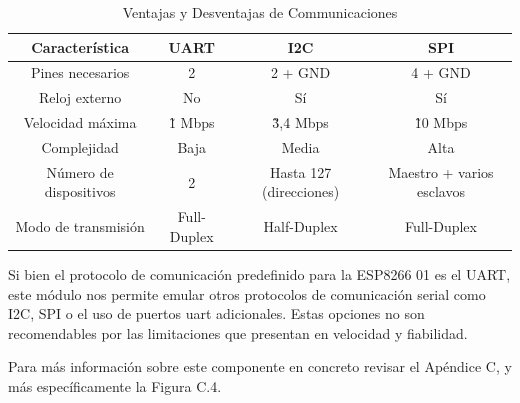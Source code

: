                 \begin{table}[H]
                    \centering
                    \begin{tabular}{|c|c|c|c|}
                        \hline
                         Característica & UART & I2C & SPI\\
                        \hline
                         Pines necesarios & 2 & 2 + GND & 4 + GND\\
                        \hline
                        Reloj externo & No & Sí & Sí\\
                        \hline
                        Velocidad máxima & \~1 Mbps & \~3,4 Mbps & \~10 Mbps\\
                        \hline
                        Complejidad & Baja & Media & Alta\\
                        \hline
                        Número de dispositivos & 2 & Hasta 127 (direcciones) & Maestro + varios esclavos\\
                        \hline
                        Modo de transmisión & Full-Duplex & Half-Duplex & Full-Duplex\\
                        \hline
                    \end{tabular}
                    \caption{Ventajas y Desventajas de Communicaciones}
                    \label{tab:s6}
                \end{table}
                
                Si  bien el protocolo de comunicación predefinido para la ESP8266 01 es el UART, este módulo nos permite emular otros protocolos de comunicación serial como I2C, SPI o el uso de puertos uart adicionales. Estas opciones no son recomendables por las limitaciones que presentan en velocidad y fiabilidad.\par
                Para más información sobre este componente en concreto revisar el Apéndice C, y más específicamente la Figura C.4.\par
                
